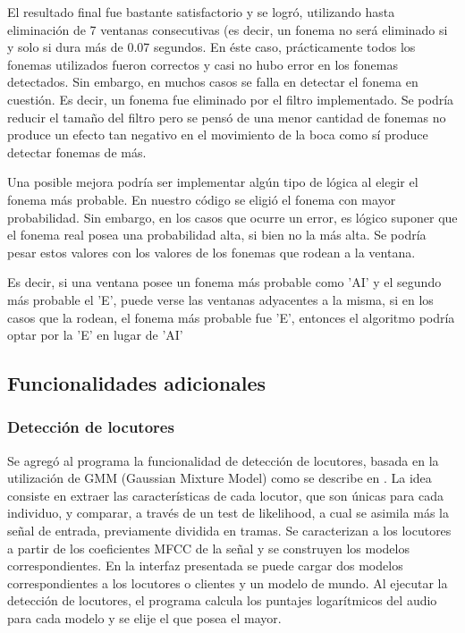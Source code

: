 \documentclass{article}
\begin{document}
El resultado final fue bastante satisfactorio y se logró, utilizando hasta eliminación de 7 ventanas consecutivas (es decir, un fonema no será eliminado si y solo si dura más de 0.07 segundos. En éste caso, prácticamente todos los fonemas utilizados fueron correctos y casi no hubo error en los fonemas detectados. Sin embargo, en muchos casos se falla en detectar el fonema en cuestión. Es decir, un fonema fue eliminado por el filtro implementado. Se podría reducir el tamaño del filtro pero se pensó de una menor cantidad de fonemas no produce un efecto tan negativo en el movimiento de la boca como sí produce detectar fonemas de más.

Una posible mejora podría ser implementar algún tipo de lógica al elegir el fonema más probable. En nuestro código se eligió el fonema con mayor probabilidad. Sin embargo, en los casos que ocurre un error, es lógico suponer que el fonema real posea una probabilidad alta, si bien no la más alta. Se podría pesar estos valores con los valores de los fonemas que rodean a la ventana.

Es decir, si una ventana posee un fonema más probable como 'AI' y el segundo más probable el 'E', puede verse las ventanas adyacentes a la misma, si en los casos que la rodean, el fonema más probable fue 'E', entonces el algoritmo podría optar por la 'E' en lugar de 'AI'

\subsection*{Funcionalidades adicionales}

\subsubsection*{Detección de locutores}

Se agregó al programa la funcionalidad de detección de locutores, basada en la utilización de GMM (Gaussian Mixture Model) como se describe en \cite{tiwari2010mfcc}. La idea consiste en extraer las características de cada locutor, que son únicas para cada individuo, y comparar, a través de un test de likelihood, a cual se asimila más la señal de entrada, previamente dividida en tramas. Se caracterizan a los locutores a partir de los coeficientes MFCC de la señal y se construyen los modelos correspondientes. En la interfaz presentada se puede cargar dos modelos correspondientes a los locutores o clientes y un modelo de mundo. Al ejecutar la detección de locutores, el programa calcula los puntajes logarítmicos del audio para cada modelo y se elije el que posea el mayor.
\end{document}
